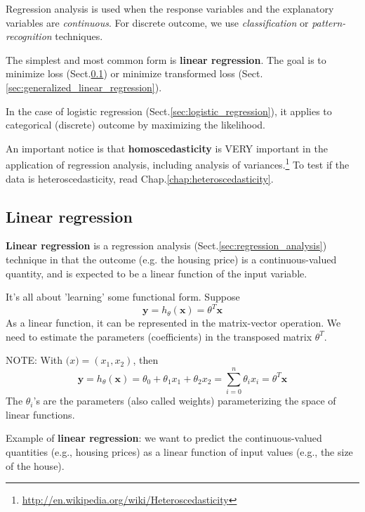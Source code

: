 Regression analysis is used when the response variables and the explanatory
variables are {\it continuous}. For discrete outcome, we use {\it
classification} or {\it pattern-recognition} techniques.


The simplest and most common form is {\bf linear regression}. The goal is to
minimize loss (Sect.\ref{sec:linear_regression}) or minimize transformed loss
(Sect.\ref{sec:generalized_linear_regression}).

In the case of logistic regression (Sect.\ref{sec:logistic_regression}), it
applies to categorical (discrete) outcome by maximizing the likelihood.

An important notice is that {\bf homoscedasticity} is VERY important in the
application of regression analysis, including analysis of
variances.\footnote{\url{http://en.wikipedia.org/wiki/Heteroscedasticity}} To
test if the data is heteroscedasticity, read Chap.\ref{chap:heteroscedasticity}.

\subsection{Linear regression}
\label{sec:linear_regression}

{\bf Linear regression} is a regression analysis
(Sect.\ref{sec:regression_analysis}) technique in that the outcome (e.g.
the housing price) is a continuous-valued quantity, and is expected to be a
linear function of the input variable.

It's all about 'learning' some functional form. Suppose 
\begin{equation}
\mathbf{y} = h_\theta(\mathbf{x}) = \theta^T \mathbf{x}
\end{equation}
As a linear function, it can be represented in the matrix-vector operation.
We need to estimate the parameters (coefficients) in the transposed matrix
$\theta^T$.

\begin{mdframed}
NOTE: With $\mathbf(x) = (x_1, x_2)$, then
\begin{equation}
\mathbf{y} = h_\theta(\mathbf{x}) = \theta_0 + \theta_1 x_1 + \theta_2 x_2 = 
  \sum_{i=0}^n \theta_i x_i = \theta^T \mathbf{x}
\end{equation}
The $\theta_i$'s are the parameters
(also called weights) parameterizing the
space of linear functions.

\end{mdframed}

Example of {\bf linear regression}:
we want to predict the continuous-valued quantities (e.g., housing prices) as a
linear function of input values (e.g., the size of the house).

